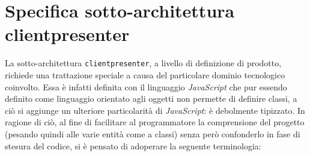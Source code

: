 \clearpage

\section{Specifica sotto-architettura clientpresenter}\label{sec:clientpresenterarchitecture}

La sotto-architettura \texttt{clientpresenter}, a livello di definizione di prodotto, richiede una trattazione speciale a causa del particolare dominio tecnologico coinvolto. Essa è infatti definita con il linguaggio \textit{JavaScript} che pur essendo definito come linguaggio orientato agli oggetti non permette di definire classi, a ciò si aggiunge un ulteriore particolarità di \textit{JavaScript}: è debolmente tipizzato.
In ragione di ciò, al fine di facilitare al programmatore la comprensione del progetto (pesando quindi alle varie entità come a classi) senza però confonderlo in fase di stesura del codice, si è pensato di adoperare la seguente terminologia:

